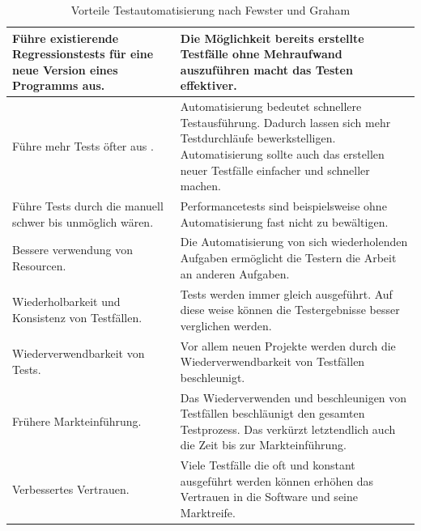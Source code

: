 \begin{table}
\begin{tabular}{p{}|p{}}
Führe existierende Regressionstests für eine neue Version eines Programms aus.
& Die Möglichkeit bereits erstellte Testfälle ohne Mehraufwand auszuführen macht das Testen effektiver. \\
\hline 
Führe mehr Tests öfter aus .
& Automatisierung bedeutet schnellere Testausführung. Dadurch lassen sich mehr Testdurchläufe bewerkstelligen. Automatisierung sollte auch das erstellen neuer Testfälle einfacher und schneller machen. \\ 
\hline 
Führe Tests durch die manuell schwer bis unmöglich wären. & 
Performancetests sind beispielsweise ohne Automatisierung fast nicht zu bewältigen.\\ 
\hline 
Bessere verwendung von Resourcen. & Die Automatisierung von sich wiederholenden Aufgaben ermöglicht die Testern die Arbeit an anderen Aufgaben. \\ 
\hline 
Wiederholbarkeit und Konsistenz von Testfällen. & Tests werden immer gleich ausgeführt. Auf diese weise können die Testergebnisse besser verglichen werden. \\ 
\hline 
Wiederverwendbarkeit von Tests. & Vor allem neuen Projekte werden durch die Wiederverwendbarkeit von Testfällen beschleunigt. \\ 
\hline 
Frühere Markteinführung. & Das Wiederverwenden und beschleunigen von Testfällen beschläunigt den gesamten Testprozess. Das verkürzt letztendlich auch die Zeit bis zur Markteinführung. \\ 
\hline 
Verbessertes Vertrauen. & Viele Testfälle die oft und konstant ausgeführt werden können erhöhen das Vertrauen in die Software und seine Marktreife.\\ 

\end{tabular} 
\caption{Vorteile Testautomatisierung nach Fewster und Graham \cite{fewster_software_1999}}
\label{tbl:vorteile_testautomatisierung}
\end{table}



